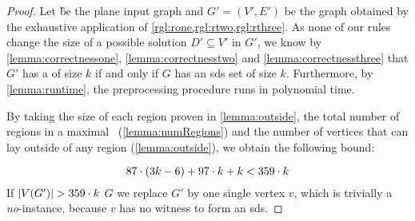 \begin{proof}
    Let \G be the plane input graph and $G'=(V',E')$ be the graph obtained by the exhaustive application of \cref{rgl:rone,rgl:rtwo,rgl:rthree}.
    As none of our rules change the size of a possible solution $D' \subseteq V'$ in $G'$, we know by \cref{lemma:correctnessone}, \cref{lemma:correctnesstwo} and \cref{lemma:correctnessthree} that $G'$ has a \sdom of size $k$ if and only if $G$ has an sds set of size $k$.
    Furthermore, by \cref{lemma:runtime}, the preprocessing procedure runs in polynomial time.
    
    By taking the size of each region proven in \cref{lemma:outside}, the total number of regions in a maximal \dreg~(\cref{lemma:numRegions}) and the number of vertices that can lay outside of any region (\cref{lemma:outside}), we obtain the following bound:
    
    \begin{equation}
         87 \cdot (3k - 6) + 97 \cdot k + k < 359 \cdot k
    \end{equation}
    \noindent If $\abs{V(G')} > 359 \cdot k$ $G$ we replace $G'$ by one single vertex $v$, which is trivially a \emph{no}-instance, because $v$ has no witness to form an sds.

\end{proof}